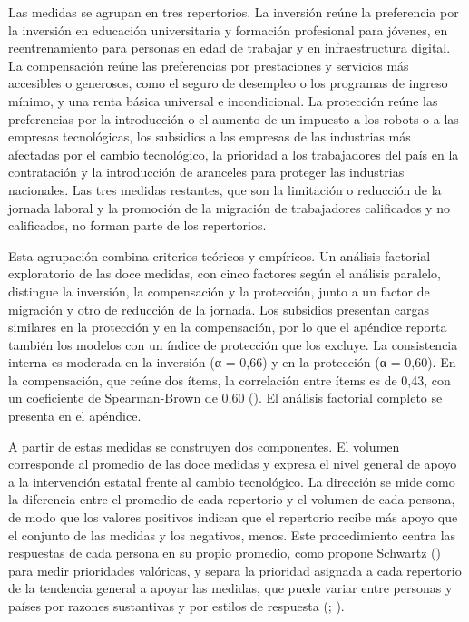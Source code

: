 \documentclass[
  spanish,
  12pt,
]{article}
\begin{document}
Las medidas se agrupan en tres repertorios. La inversión reúne la
preferencia por la inversión en educación universitaria y formación
profesional para jóvenes, en reentrenamiento para personas en edad de
trabajar y en infraestructura digital. La compensación reúne las
preferencias por prestaciones y servicios más accesibles o generosos,
como el seguro de desempleo o los programas de ingreso mínimo, y una
renta básica universal e incondicional. La protección reúne las
preferencias por la introducción o el aumento de un impuesto a los
robots o a las empresas tecnológicas, los subsidios a las empresas de
las industrias más afectadas por el cambio tecnológico, la prioridad a
los trabajadores del país en la contratación y la introducción de
aranceles para proteger las industrias nacionales. Las tres medidas
restantes, que son la limitación o reducción de la jornada laboral y la
promoción de la migración de trabajadores calificados y no calificados,
no forman parte de los repertorios.

Esta agrupación combina criterios teóricos y empíricos. Un análisis
factorial exploratorio de las doce medidas, con cinco factores según el
análisis paralelo, distingue la inversión, la compensación y la
protección, junto a un factor de migración y otro de reducción de la
jornada. Los subsidios presentan cargas similares en la protección y en
la compensación, por lo que el apéndice reporta también los modelos con
un índice de protección que los excluye. La consistencia interna es
moderada en la inversión (α = 0,66) y en la protección (α = 0,60). En la
compensación, que reúne dos ítems, la correlación entre ítems es de
0,43, con un coeficiente de Spearman-Brown de 0,60
().
El análisis factorial completo se presenta en el apéndice.

A partir de estas medidas se construyen dos componentes. El volumen
corresponde al promedio de las doce medidas y expresa el nivel general
de apoyo a la intervención estatal frente al cambio tecnológico. La
dirección se mide como la diferencia entre el promedio de cada
repertorio y el volumen de cada persona, de modo que los valores
positivos indican que el repertorio recibe más apoyo que el conjunto de
las medidas y los negativos, menos. Este procedimiento centra las
respuestas de cada persona en su propio promedio, como propone Schwartz
() para medir prioridades
valóricas, y separa la prioridad asignada a cada repertorio de la
tendencia general a apoyar las medidas, que puede variar entre personas
y países por razones sustantivas y por estilos de respuesta
(;
).
\end{document}
